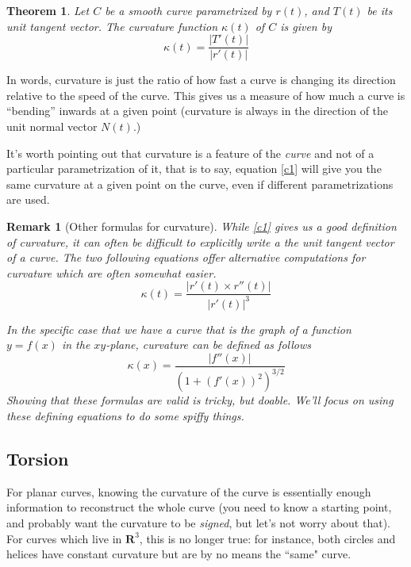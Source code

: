 \documentclass[12pt]{article}
\numberwithin{equation}{subsection}
\numberwithin{figure}{subsection}
\newtheorem{thm}[subsection]{Theorem}
\theoremstyle{note}
\newtheorem{remark}[subsection]{Remark}
\begin{document}
{\begin{thm} Let $C$ be a smooth curve parametrized by $r(t)$, and $T(t)$ be its unit tangent vector.  The curvature function $\kappa(t)$ of $C$ is given by \begin{equation} \label{c1}
	\kappa(t) = \dfrac{|T'(t)|}{|r'(t)|}
\end{equation}
\end{thm}

In words, curvature is just the ratio of how fast a curve is changing its direction relative to the speed of the curve. This gives us a measure of how much a curve is ``bending'' inwards at a given point (curvature is always in the direction of the unit normal vector $N(t)$.) 

It's worth pointing out that curvature is a feature of the \textit{curve} and not of a particular parametrization of it, that is to say, equation \eqref{c1} will give you the same curvature at a given point on the curve, even if different parametrizations are used. 

\begin{remark}[Other formulas for curvature]While \eqref{c1} gives us a good definition of curvature, it can often be difficult to explicitly write a the unit tangent vector of a curve. The two following equations offer alternative computations for curvature which are often somewhat easier. \begin{equation} \label{c2}
	\kappa(t)= \dfrac{ |r'(t) \times r''(t)| }{|r'(t)|^3} \end{equation}

In the specific case that we have a curve that is the graph of a function $y=f(x)$ in the $xy$-plane, curvature can be defined as follows \begin{equation} \label{c3}
	\kappa(x)=\dfrac{|f''(x)|}{\left(1+(f'(x))^2\right)^{3/2}} \end{equation} 
Showing that these formulas are valid is tricky, but doable. We'll focus on using these defining equations to do some spiffy things. \end{remark}

\subsection{Torsion} For planar curves, knowing the curvature of the curve is essentially enough information to reconstruct the whole curve (you need to know a starting point, and probably want the curvature to be \textit{signed}, but let's not worry about that). For curves which live in $\mathbf{R}^3$, this is no longer true: for instance, both circles and helices have constant curvature but are by no means the ``same" curve. 

}
\end{document}
